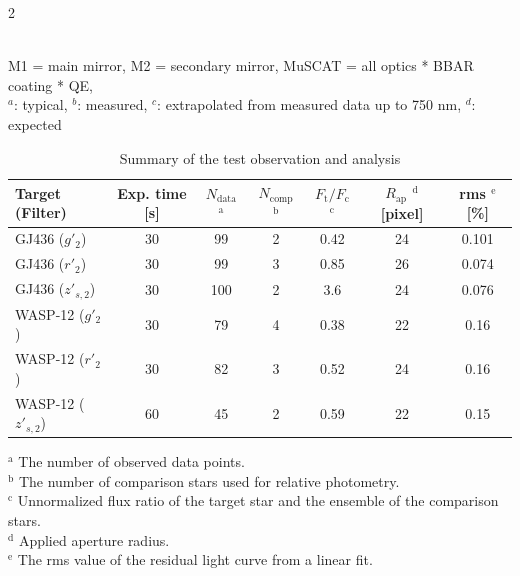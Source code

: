 \documentclass[a4paper,12pt]{spieman}  %
\begin{document}
\begin{spacing}{2}
\begin{table}
\begin{center}
{\footnotesize
\caption{Summary of throughput (TP) of MuSCAT on the 188cm telescope at OAO}
\label{throughput}
}
{\scriptsize \\ M1 = main mirror, M2 = secondary mirror, MuSCAT = all optics * BBAR coating * QE,\\
$^a$: typical, $^b$: measured, $^c$: extrapolated from measured data up to 750 nm,
$^d$: expected}
\end{center}
\end{table}

\begin{table}[t]
\begin{center}
\caption{Summary of the test observation and analysis
\label{tbl:testobs}}
\vspace{5pt}
\small
\begin{tabular}{lcccccc}
\hline
\hline
Target (Filter) & Exp. time [s] & $N_\mathrm{data}$ $^\mathrm{a}$ & $N_\mathrm{comp}$ $^\mathrm{b}$ & $F_\mathrm{t}/F_\mathrm{c}$ $^\mathrm{c}$ & $R_\mathrm{ap}$ $^\mathrm{d}$ [pixel]  & rms $^\mathrm{e}$ [\%]  \\
\hline
GJ436 ($g'_2$) & 30 & 99 & 2 & 0.42 & 24 & 0.101\\
GJ436 ($r'_2$) & 30 & 99 & 3 & 0.85 & 26 & 0.074\\
GJ436 ($z'_{s,2}$) & 30 & 100 & 2 & 3.6 & 24  & 0.076\\
WASP-12 ($g'_2$) & 30 & 79 & 4 & 0.38 & 22 & 0.16\\
WASP-12 ($r'_2$) & 30 & 82 & 3 & 0.52 & 24 & 0.16\\
WASP-12 ($z'_{s,2}$) & 60 & 45 & 2 & 0.59 & 22 & 0.15\\
\hline
\end{tabular}
\end{center}
{\scriptsize
$^\mathrm{a}$ The number of observed data points.\\
$^\mathrm{b}$ The number of comparison stars used for relative photometry.\\
$^\mathrm{c}$ Unnormalized flux ratio of the target star and the ensemble of the comparison stars.\\
$^\mathrm{d}$ Applied aperture radius.\\
$^\mathrm{e}$ The rms value of the residual light curve from a linear fit.\\
}
\end{table}


\end{spacing}
\end{document}
